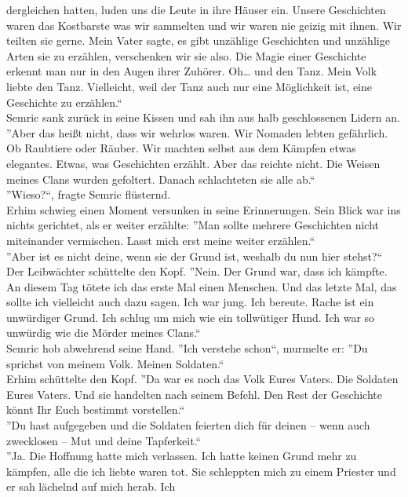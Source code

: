 dergleichen hatten, luden uns die Leute in ihre Häuser ein. Unsere Geschichten waren das Kostbarste 
was wir sammelten und wir waren nie geizig mit ihnen. Wir teilten sie gerne. Mein Vater sagte, es 
gibt unzählige Geschichten und unzählige Arten sie zu erzählen, verschenken wir sie also. Die Magie 
einer Geschichte erkennt man nur in den Augen ihrer Zuhörer. Oh… und den Tanz. Mein Volk liebte den 
Tanz. Vielleicht, weil der Tanz auch nur eine Möglichkeit ist, eine Geschichte zu erzählen.``\\
Semric sank zurück in seine Kissen und sah ihn aus halb geschlossenen Lidern an. \\
''Aber das heißt nicht, dass wir wehrlos waren. Wir Nomaden lebten gefährlich. Ob Raubtiere oder 
Räuber. Wir machten selbst aus dem Kämpfen etwas elegantes. Etwas, was Geschichten erzählt. Aber 
das reichte nicht. Die Weisen meines Clans wurden gefoltert. Danach schlachteten sie alle ab.``\\
''Wieso?``, fragte Semric flüsternd.\\
Erhim schwieg einen Moment versunken in seine Erinnerungen. Sein Blick war ins nichts gerichtet, 
als 
er weiter erzählte: ''Man sollte mehrere Geschichten nicht miteinander vermischen. Lasst mich erst 
meine weiter erzählen.``\\
''Aber ist es nicht deine, wenn sie der Grund ist, weshalb du nun hier stehst?``\\
Der Leibwächter schüttelte den Kopf. ''Nein. Der Grund war, dass ich kämpfte. An diesem Tag tötete 
ich das erste Mal einen Menschen. Und das letzte Mal, das sollte ich vielleicht auch dazu sagen. 
Ich war jung. Ich bereute. Rache ist ein unwürdiger Grund. Ich schlug um mich wie ein tollwütiger 
Hund. Ich war so unwürdig wie die Mörder meines Clans.``\\
Semric hob abwehrend seine Hand. ''Ich verstehe schon``, murmelte er: ''Du sprichst von meinem 
Volk. Meinen Soldaten.``\\
Erhim schüttelte den Kopf. ''Da war es noch das Volk Eures Vaters. Die Soldaten Eures Vaters. Und 
sie handelten nach seinem Befehl. Den Rest der Geschichte könnt Ihr Euch bestimmt vorstellen.``\\
''Du hast aufgegeben und die Soldaten feierten dich für deinen – wenn auch zwecklosen – Mut und 
deine Tapferkeit.``\\
''Ja. Die Hoffnung hatte mich verlassen. Ich hatte keinen Grund mehr zu kämpfen, alle die ich 
liebte waren tot. Sie schleppten mich zu einem Priester und er sah lächelnd auf mich herab. Ich 
